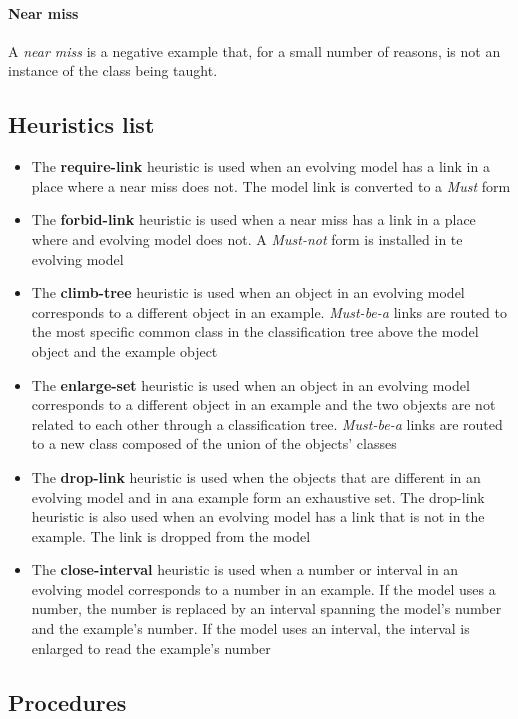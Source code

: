 \documentclass{article}
\begin{document}
\paragraph{Near miss} A \textit{near miss} is a negative example
that, for a small number of reasons, is not an instance of the
class being taught.

\subsection{Heuristics list}
\begin{itemize}
  \item The \textbf{require-link} heuristic is used when an
    evolving model has a link in a place where a near miss does
    not. The model link is converted to a \textit{Must} form
  \item The \textbf{forbid-link} heuristic is used when a near miss
    has a link in a place where and evolving model does not. A
    \textit{Must-not} form is installed in te evolving model
  \item The \textbf{climb-tree} heuristic is used when an object in
    an evolving model corresponds to a different object in an
    example. \textit{Must-be-a} links are routed to the most
    specific common class in the classification tree above the
    model object and the example object
  \item The \textbf{enlarge-set} heuristic is used when an object
    in an evolving model corresponds to a different object in an
    example and the two objexts are not related to each other
    through a classification tree. \textit{Must-be-a} links are
    routed to a new class composed of the union of the objects'
    classes
  \item The \textbf{drop-link} heuristic is used when the objects
    that are different in an evolving model and in ana example form
    an exhaustive set. The drop-link heuristic is also used when
    an evolving model has a link that is not in the example. The
    link is dropped from the model
  \item The \textbf{close-interval} heuristic is used when a number
    or interval in an evolving model corresponds to a number in an
    example. If the model uses a number, the number is replaced by
    an interval spanning the model's number and the example's
    number. If the model uses an interval, the interval is enlarged
    to read the example's number
\end{itemize}

\subsection{Procedures}
\end{document}
